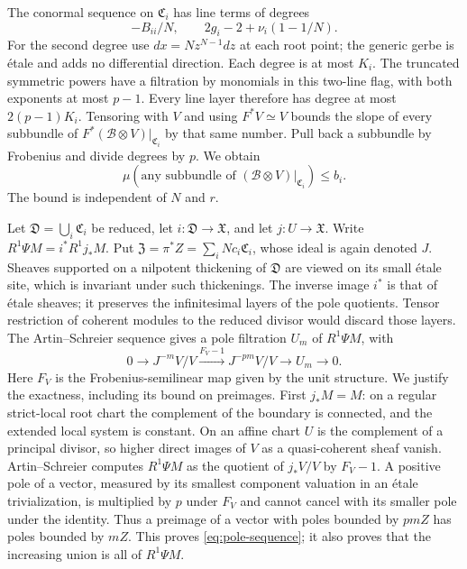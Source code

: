 The conormal sequence on $\mathfrak C_i$ has line terms of degrees
\[
 -B_{ii}/N,\qquad 2g_i-2+\nu_i(1-1/N).
\]
For the second degree use $dx=Nz^{N-1}dz$ at each root point; the generic gerbe is \'etale and adds no differential direction. Each degree is at most $K_i$. The truncated symmetric powers have a filtration by monomials in this two-line flag, with both exponents at most $p-1$. Every line layer therefore has degree at most $2(p-1)K_i$. Tensoring with $V$ and using $F^*V\simeq V$ bounds the slope of every subbundle of $F^*(\mathcal B\otimes V)|_{\mathfrak C_i}$ by that same number. Pull back a subbundle by Frobenius and divide degrees by $p$. We obtain
\begin{equation}\label{eq:frobenius-slope}
 \mu(\text{any subbundle of }(\mathcal B\otimes V)|_{\mathfrak C_i})\leq b_i.
\end{equation}
The bound is independent of $N$ and $r$.

Let $\mathfrak D=\bigcup_i\mathfrak C_i$ be reduced, let $i:\mathfrak D\to\mathfrak X$, and let $j:U\to\mathfrak X$. Write $R^1\Psi M=i^*R^1j_*M$. Put $\mathfrak Z=\pi^*Z=\sum_iNc_i\mathfrak C_i$, whose ideal is again denoted $J$. Sheaves supported on a nilpotent thickening of $\mathfrak D$ are
viewed on its small \'etale site, which is invariant under such
thickenings. The inverse image $i^*$ is that of \'etale sheaves;
it preserves the infinitesimal layers of the pole quotients.
Tensor restriction of coherent modules to the reduced divisor
would discard those layers. The Artin--Schreier sequence gives
a pole filtration $U_m$ of $R^1\Psi M$, with
\begin{equation}\label{eq:pole-sequence}
 0\longrightarrow J^{-m}V/V\xrightarrow{F_V-1}J^{-pm}V/V
       \longrightarrow U_m\longrightarrow0.
\end{equation}
Here $F_V$ is the Frobenius-semilinear map given by the unit structure. We justify the exactness, including its bound on preimages. First $j_*M=M$: on a regular strict-local root chart the complement of the boundary is connected, and the extended local system is constant. On an affine chart $U$ is the complement of a principal divisor, so higher direct images of $V$ as a quasi-coherent sheaf vanish. Artin--Schreier computes $R^1\Psi M$ as the quotient of $j_*V/V$ by $F_V-1$. A positive pole of a vector, measured by its smallest component valuation in an \'etale trivialization, is multiplied by $p$ under $F_V$ and cannot cancel with its smaller pole under the identity. Thus a preimage of a vector with poles bounded by $pmZ$ has poles bounded by $mZ$. This proves \eqref{eq:pole-sequence}; it also proves that the increasing union is all of $R^1\Psi M$.

